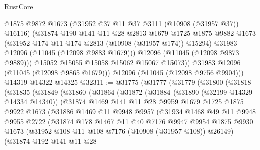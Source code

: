 \begin{lexlean}{RustCore}
\begin{coremodule}
              @1875
              @9872
              @1673
              (@31952 @37 @11 @37 @3111 (@10908 (@31957 @37)) @16116)
              (@31874
                @190
                @141
                @11
                @28
                @2813
                @1679
                @1725
                @1875
                @9882
                @1673
                (@31952 @174 @11 @174 @2813 (@10908 (@31957 @174)) @15294)
                @31983
                @12096
                (@11045 (@12098 @9883 @1679)))
              @12096
              (@11045 (@12098 @9873 @9889)))
            @15052
            @15055
            @15058
            @15062
            @15067
            @15073))
        @31983
        @12096
        (@11045 (@12098 @9865 @1679)))
      @12096
      (@11045 (@12098 @9756 @9904)))
    @14319
    @14322
    @14325
@32311 := @31775
    (@31777
      (@31779
        (@31800
          (@31818
            (@31835
              (@31849
                (@31860
                  (@31864
                    (@31872
                      (@31884
                        (@31890 (@32199 @14329 @14334 @14340))
                        (@31874
                          @1469
                          @141
                          @11
                          @28
                          @9959
                          @1679
                          @1725
                          @1875
                          @9922
                          @1673
                          (@31886
                            @1469
                            @11
                            @9948
                            @9957
                            (@31934
                              @1468
                              @49
                              @11
                              @9948
                              @9955
                              @2722
                              (@31874
                                @178
                                @1467
                                @11
                                @40
                                @7176
                                @9947
                                @9954
                                @1875
                                @9930
                                @1673
                                (@31952 @108 @11 @108 @7176 (@10908 (@31957 @108)) @26149)
                                (@31874
                                  @192
                                  @141
                                  @11
                                  @28

\end{coremodule}
\end{lexlean}

